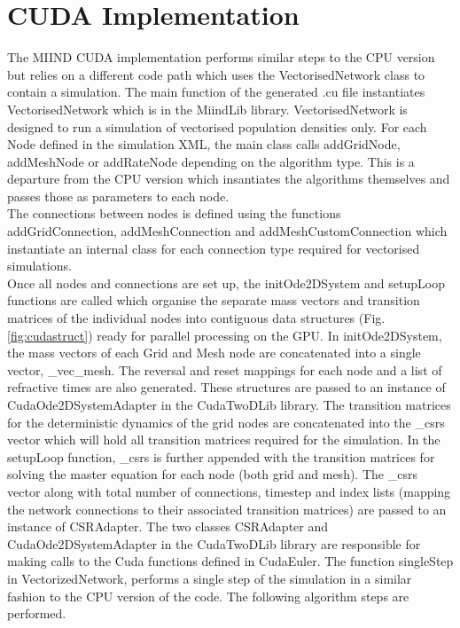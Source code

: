 \documentclass[utf8]{frontiers_suppmat} %
\begin{document}
\section{CUDA Implementation}
\label{cudaimplement}
The MIIND CUDA implementation performs similar steps to the CPU version but relies on a different code path which uses the VectorisedNetwork class to contain a simulation. The main function of the generated .cu file instantiates VectorisedNetwork which is in the MiindLib library. VectorisedNetwork is designed to run a simulation of vectorised population densities only. For each Node defined in the simulation XML, the main class calls addGridNode, addMeshNode or addRateNode depending on the algorithm type. This is a departure from the CPU version which insantiates the algorithms themselves and passes those as parameters to each node.\\
The connections between nodes is defined using the functions addGridConnection, addMeshConnection and addMeshCustomConnection which instantiate an internal class for each connection type required for vectorised simulations.\\
Once all nodes and connections are set up, the initOde2DSystem and setupLoop functions are called which organise the separate mass vectors and transition matrices of the individual nodes into contiguous data structures (Fig. \ref{fig:cudastruct}) ready for parallel processing on the GPU. In initOde2DSystem, the mass vectors of each Grid and Mesh node are concatenated into a single vector, \_vec\_mesh. The reversal and reset mappings for each node and a list of refractive times are also generated. These structures are passed to an instance of CudaOde2DSystemAdapter in the CudaTwoDLib library. The transition matrices for the deterministic dynamics of the grid nodes are concatenated into the \_csrs vector which will hold all transition matrices required for the simulation. In the setupLoop function, \_csrs is further appended with the transition matrices for solving the master equation for each node (both grid and mesh). The \_csrs vector along with total number of connections, timestep and index lists (mapping the network connections to their associated transition matrices) are passed to an instance of CSRAdapter. The two classes CSRAdapter and CudaOde2DSystemAdapter in the CudaTwoDLib library are responsible for making calls to the Cuda functions defined in CudaEuler. The function singleStep in VectorizedNetwork, performs a single step of the simulation in a similar fashion to the CPU version of the code. The following algorithm steps are performed.\\
\end{document}
